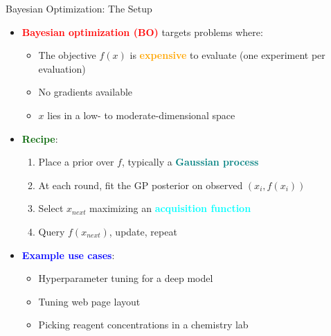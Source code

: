 \documentclass[
  10pt,
  ignorenonframetext,
]{beamer}
\providecommand{\tightlist}{%
  \setlength{\itemsep}{0pt}\setlength{\parskip}{0pt}}
\begin{document}
\begin{frame}{Bayesian Optimization: The Setup}
\label{bayesian-optimization-the-setup}
\begin{itemize}
\tightlist
\item
  \textbf{\textcolor{red}{Bayesian optimization (BO)}} targets problems
  where:

  \begin{itemize}
  \tightlist
  \item
    The objective \(f(x)\) is \textbf{\textcolor{orange}{expensive}} to
    evaluate (one experiment per evaluation)
  \item
    No gradients available
  \item
    \(x\) lies in a low- to moderate-dimensional space
  \end{itemize}
\item
  \textbf{\textcolor{darkgreen}{Recipe}}:

  \begin{enumerate}
  \tightlist
  \item
    Place a prior over \(f\), typically a
    \textbf{\textcolor{teal}{Gaussian process}}
  \item
    At each round, fit the GP posterior on observed \((x_i, f(x_i))\)
  \item
    Select \(x_{next}\) maximizing an
    \textbf{\textcolor{cyan}{acquisition function}}
  \item
    Query \(f(x_{next})\), update, repeat
  \end{enumerate}
\item
  \textbf{\textcolor{blue}{Example use cases}}:

  \begin{itemize}
  \tightlist
  \item
    Hyperparameter tuning for a deep model
  \item
    Tuning web page layout
  \item
    Picking reagent concentrations in a chemistry lab
  \end{itemize}
\end{itemize}
\end{frame}
\end{document}

